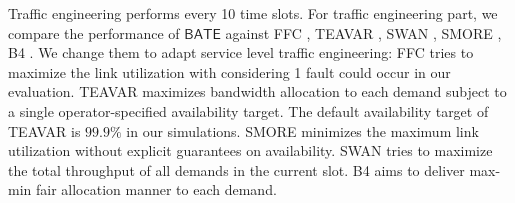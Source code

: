\documentclass[sigconf]{acmart}
\begin{document}

Traffic engineering performs every 10 time slots.
For traffic engineering part, we compare the performance of $\mathsf{BATE}$ against FFC \cite{FFC}, TEAVAR \cite{Teavar}, SWAN \cite{swan}, SMORE \cite{SMORE}, B4 \cite{B4}.
We change them to adapt service level traffic engineering: 
FFC tries to maximize the link utilization with considering 1 fault could occur in our evaluation.
TEAVAR maximizes bandwidth allocation to each demand subject to a single operator-specified availability target.
The default availability target of TEAVAR is $99.9\%$ in our simulations.
SMORE \cite{SMORE} minimizes the maximum link utilization without explicit guarantees on availability.
SWAN \cite{swan}  tries to  maximize the total throughput of all demands in the current slot.
B4 \cite{B4} aims to deliver max-min fair allocation manner to each demand.
\fi
\end{document}
